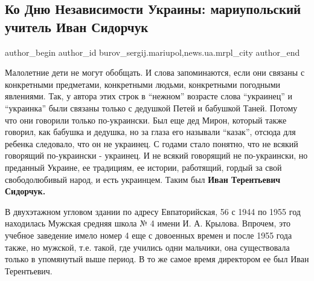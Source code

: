  
 
 
 
 
 
\subsection{Ко Дню Независимости Украины: мариупольский учитель Иван Сидорчук}
\label{sec:24_08_2019.stz.news.ua.mrpl_city.1.mariupol_uchitel_ivan_sidorchuk}
 
\ifcmt
 author_begin
   author_id burov_sergij.mariupol,news.ua.mrpl_city
 author_end
\fi


Малолетние дети не могут обобщать. И слова запоминаются, если они связаны с
конкретными предметами, конкретными людьми, конкретными погодными явлениями.
Так, у автора этих строк в \enquote{нежном} возрасте слова \enquote{украинец} и
\enquote{украинка} были связаны только с дедушкой Петей и бабушкой Таней.
Потому что они говорили только по-украински. Был еще дед Мирон, который также
говорил, как бабушка и дедушка, но за глаза его называли \enquote{казак},
отсюда для ребенка следовало, что он не украинец. С годами стало понятно, что
не всякий говорящий по-украински - украинец. И не всякий говорящий не
по-украински, но преданный Украине, ее традициям, ее истории, работящий, гордый
за свой свободолюбивый народ, и есть украинцем. Таким был \textbf{Иван
Терентьевич Сидорчук.}

В двухэтажном угловом здании по адресу Евпаторийская, 56  с 1944 по 1955 год
находилась Мужская средняя школа № 4 имени И. А. Крылова. Впрочем, это учебное
заведение имело номер 4 еще с довоенных времен и после 1955 года также, но
мужской, т.е. такой, где учились одни мальчики, она существовала только в
упомянутый выше период. В то же самое время директором ее был Иван Терентьевич.

